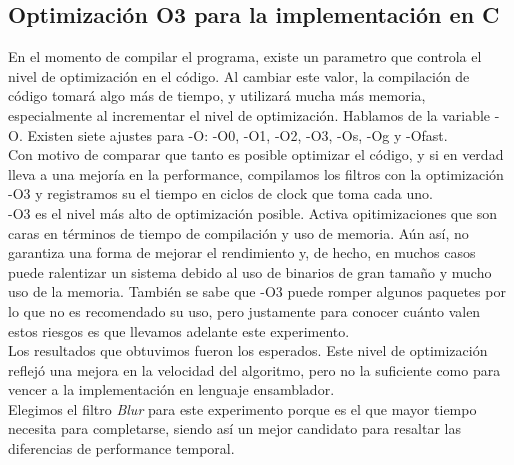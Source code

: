 \documentclass[10pt,a4paper,spanish]{article}
\begin{document}
\subsection{Optimización O3 para la implementación en C}

En el momento de compilar el programa, existe un parametro que controla el nivel de optimización en el código. Al cambiar este valor, la compilación de código tomará algo más de tiempo, y utilizará mucha más memoria, especialmente al incrementar el nivel de optimización. Hablamos de la variable -O. Existen siete ajustes para -O: -O0, -O1, -O2, -O3, -Os, -Og y -Ofast. \\

Con motivo de comparar que tanto es posible optimizar el código, y si en verdad lleva a una mejoría en la performance, compilamos los filtros con la optimización -O3 y registramos su el tiempo en ciclos de clock que toma cada uno. \\

-O3 es el nivel más alto de optimización posible. Activa opitimizaciones que son caras en términos de tiempo de compilación y uso de memoria. Aún así, no garantiza una forma de mejorar el rendimiento y, de hecho, en muchos casos puede ralentizar un sistema debido al uso de binarios de gran tamaño y mucho uso de la memoria. También se sabe que -O3 puede romper algunos paquetes por lo que no es recomendado su uso, pero justamente para conocer cuánto valen estos riesgos es que llevamos adelante este experimento. \\

Los resultados que obtuvimos fueron los esperados. Este nivel de optimización reflejó una mejora en la velocidad del algoritmo, pero no la suficiente como para vencer a la implementación en lenguaje ensamblador. \\

Elegimos el filtro \textit{Blur} para este experimento porque es el que mayor tiempo necesita para completarse, siendo así un mejor candidato para resaltar las diferencias de performance temporal. \\

\end{document}
